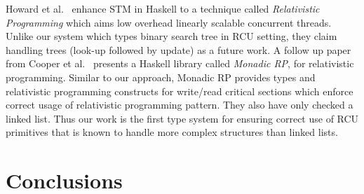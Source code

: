 Howard et al.~\cite{Howard:2011:RES:2001252.2001267} enhance \textsf{STM} in Haskell to a technique called \textit{Relativistic Programming} which aims low overhead linearly scalable concurrent threads. Unlike our system which types binary search tree in \textsf{RCU} setting, they claim  handling trees (look-up followed by update) as a future work.
A follow up paper from Cooper et al.~\cite{Cooper2015RelativisticPI} presents a \textsf{Haskell} library called \emph{Monadic RP}, for relativistic programming. Similar to our approach, Monadic RP provides types and relativistic programming constructs for write/read critical sections which enforce correct usage of relativistic programming pattern. 
They also have only checked a linked list.
Thus our work is the first type system for ensuring correct use of RCU primitives that is known to handle more complex structures than linked lists.
\section{Conclusions}
\label{sec:concls}
